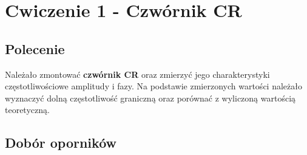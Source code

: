 \chapter{Cwiczenie 1 - Czwórnik CR}

\newcommand{\Ra}{49,4}
\newcommand{\Rb}{3,9k}
\newcommand{\Rc}{1,545k}
\newcommand{\C}{209,6nF}

\section{Polecenie}
Należało zmontować \textbf{czwórnik CR} oraz zmierzyć jego charakterystyki częstotliwościowe amplitudy i fazy. Na podstawie zmierzonych wartości należało wyznaczyć dolną częstotliwość graniczną oraz porównać z wyliczoną wartością teoretyczną.

\section{Dobór oporników}

